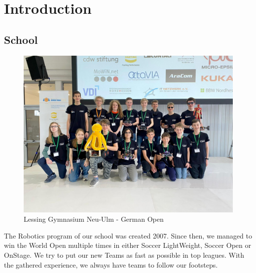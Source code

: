 \section{Introduction}

\subsection{School}
\begin{figure}[ht]
    \centering
    \includegraphics[width=\textwidth]{img/LGNU.jpg}
    \caption{Lessing Gymnasium Neu-Ulm - German Open}
    \label{fig:LGNU}
\end{figure}

\makeatletter
\providecommand{\rowno}[1][__empty__]{%
\ifthenelse{\isundefined{\c@rowno}}{%
\newcounter{rowno}}{}%
\ifthenelse{\equal{#1}{__empty__}}{%
\stepcounter{rowno}%
}{%
\setcounter{rowno}{#1}%
}%
\therowno.%
}
\makeatother

The Robotics program of our school was created 2007. Since then, we managed to win the World Open
multiple times in either Soccer LightWeight, Soccer Open or OnStage.
We try to put our new Teams as fast as possible in top leagues. With the gathered experience, we always
have teams to follow our footsteps.
\newpage

